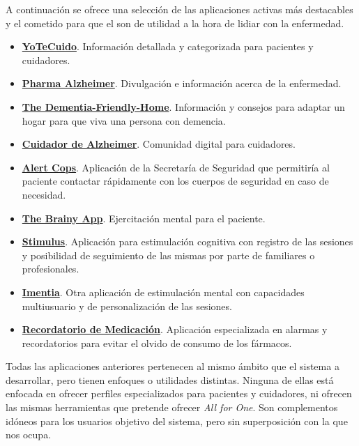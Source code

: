 A continuación se ofrece una selección de las aplicaciones activas más destacables y el cometido para que el son de utilidad a la hora de lidiar con la enfermedad.
\begin{itemize}
    \item \href{https://play.google.com/store/apps/details?id=es.lapisoft.yotecuido}{\textbf{YoTeCuido}}. Información detallada y categorizada para pacientes y cuidadores.
    \item \href{https://play.google.com/store/apps/details?id=com.egm.PharmAlzheimer}{\textbf{Pharma Alzheimer}}. Divulgación e información acerca de la enfermedad.
    \item \href{https://play.google.com/store/apps/details?id=au.com.alzheimersaustraliavic.dementiafriendlyhome}{\textbf{The Dementia-Friendly-Home}}. Información y consejos para adaptar un hogar para que viva una persona con demencia.
    \item \href{https://play.google.com/store/apps/details?id=com.goodbarber.careralzheimer}{\textbf{Cuidador de Alzheimer}}. Comunidad digital para cuidadores.
    \item \href{https://play.google.com/store/apps/details?id=com.alertcops4.app}{\textbf{Alert Cops}}. Aplicación de la Secretaría de Seguridad que permitiría al paciente contactar rápidamente con los cuerpos de seguridad en caso de necesidad.
    \item \href{https://play.google.com/store/apps/details?id=nl.neurodiversiteit.brainy&hl=es_PY}{\textbf{The Brainy App}}. Ejercitación mental para el paciente.
    \item \href{https://play.google.com/store/apps/details?id=mobi.stimulus.stimulushome&hl=es_PY}{\textbf{Stimulus}}. Aplicación para estimulación cognitiva con registro de las sesiones y posibilidad de seguimiento de las mismas por parte de familiares o profesionales.
    \item \href{https://play.google.com/store/apps/details?id=com.imentia.imentiaproffesional2&hl=es_PY}{\textbf{Imentia}}. Otra aplicación de estimulación mental con capacidades multiusuario y de personalización de las sesiones.
    \item \href{https://play.google.com/store/apps/details?id=eu.smartpatient.mytherapy&hl=es_PY}{\textbf{Recordatorio de Medicación}}. Aplicación especializada en alarmas y recordatorios para evitar el olvido de consumo de los fármacos.
\end{itemize}

Todas las aplicaciones anteriores pertenecen al mismo ámbito que el sistema a desarrollar, pero tienen enfoques o utilidades distintas. Ninguna de ellas está enfocada en ofrecer perfiles especializados para pacientes y cuidadores, ni ofrecen las mismas herramientas que pretende ofrecer \emph{All for One}. Son complementos idóneos para los usuarios objetivo del sistema, pero sin superposición con la que nos ocupa.

